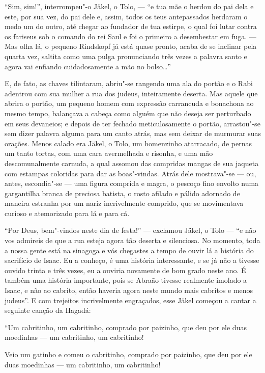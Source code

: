 ``Sim, sim!'', interrompeu"-o Jäkel, o Tolo, --- ``e tua mãe o herdou do pai
dela e este, por sua vez, do pai dele e, assim, todos os teus
antepassados herdaram o medo um do outro, até chegar ao fundador de tua
estirpe, o qual foi lutar contra os fariseus sob o comando do rei Saul
e foi o primeiro a desembestar em fuga. --- Mas olha lá, o pequeno
Rindskopf já está quase pronto, acaba de se inclinar pela quarta vez,
saltita como uma pulga pronunciando três vezes a palavra santo e agora
vai enfiando cuidadosamente a mão no bolso\ldots''

E, de fato, as chaves tilintaram, abriu"-se rangendo uma ala do portão
e o Rabi adentrou com sua mulher a rua dos judeus, inteiramente
deserta. Mas aquele que abrira o portão, um pequeno homem com expressão
carrancuda e bonachona ao mesmo tempo, balançava a cabeça como alguém
que não deseja ser perturbado em seus devaneios; e depois de ter
fechado meticulosamente o portão, arrastou"-se sem dizer palavra
alguma para um canto atrás, mas sem deixar de murmurar suas orações.
Menos calado era Jäkel, o Tolo, um homenzinho atarracado, de pernas um
tanto tortas, com uma cara avermelhada e risonha, e uma mão
descomunalmente carnuda, a qual assomou das compridas mangas de sua
jaqueta com estampas coloridas para dar as boas"-vindas. Atrás dele
mostrava"-se --- ou, antes, escondia"-se --- uma figura comprida e magra,
o pescoço fino envolto numa gargantilha branca de preciosa batista, o
rosto afilado e pálido adornado de maneira estranha por um nariz
incrivelmente comprido, que se movimentava curioso e atemorizado para
lá e para cá.

``Por Deus, bem"-vindos neste dia de festa!'' --- exclamou Jäkel, o Tolo ---
``e não vos admireis de que a rua esteja agora tão deserta e silenciosa.
No momento, toda a nossa gente está na sinagoga e vós chegastes a tempo
de ouvir lá a história do sacrifício de Isaac. Eu a conheço, é uma
história interessante, e se já não a tivesse ouvido trinta e três
vezes, eu a ouviria novamente de bom grado neste ano. É também uma
história importante, pois se Abraão tivesse realmente imolado a Isaac,
e não ao cabrito, então haveria agora neste mundo mais cabritos e menos
judeus''. E com trejeitos incrivelmente engraçados, esse Jäkel começou a
cantar a seguinte canção da Hagadá:

``Um cabritinho, um cabritinho, comprado por paizinho, que deu por ele
duas moedinhas --- um cabritinho, um cabritinho! 

Veio um gatinho e comeu o cabritinho, comprado por paizinho, que deu por
ele duas moedinhas --- um cabritinho, um cabritinho! 

